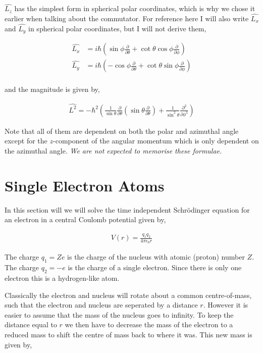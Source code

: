 \documentclass[11pt]{amsart}
\begin{document}
$\hat{L_z}$ has the simplest form in spherical polar coordinates, which is why we chose it earlier when talking about the commutator. For reference here I will also write $\hat{L_x}$ and $\hat{L_y}$ in spherical polar coordinates, but I will not derive them,

\begin{align*}
  \hat{L_x} &= i\hbar\left(\sin{\phi}\frac{\partial}{\partial\theta}+\cot{\theta}\cos{\phi}\frac{\partial}{\partial\phi}\right) \\
  \hat{L_y} &= i\hbar\left(-\cos{\phi}\frac{\partial}{\partial\theta}+\cot{\theta}\sin{\phi}\frac{\partial}{\partial\phi}\right) \\
\end{align*}

and the magnitude is given by,

\begin{align*}
  \hat{L^2} = -\hbar^2\left(\frac{1}{\sin{\theta}}\frac{\partial}{\partial\theta}\left(\sin{\theta}\frac{\partial}{\partial\theta}\right)+\frac{1}{\sin^2{\theta}}\frac{\partial^2}{\partial\phi^2}\right)
\end{align*}

Note that all of them are dependent on both the polar and azimuthal angle except for the $z$-component of the angular momentum which is only dependent on the azimuthal angle. \textit{We are not expected to memorise these formulae.}

\section{Single Electron Atoms}

In this section will we will solve the time independent Schr\"{o}dinger equation for an electron in a central Coulomb potential given by,

\begin{align*}
  V(r) = \frac{q_1 q_2}{4\pi\epsilon_0 r}
\end{align*}

The charge $q_1 = Ze$ is the charge of the nucleus with atomic (proton) number $Z$. The charge $q_2 = -e$ is the charge of a single electron. Since there is only one electron this is a hydrogen-like atom.

Classically the electron and nucleus will rotate about a common centre-of-mass, such that the electron and nucleus are seperated by a distance $r$. However it is easier to assume that the mass of the nucleus goes to infinity. To keep the distance equal to $r$ we then have to decrease the mass of the electron to a reduced mass to shift the centre of mass back to where it was. This new mass is given by,
\end{document}
